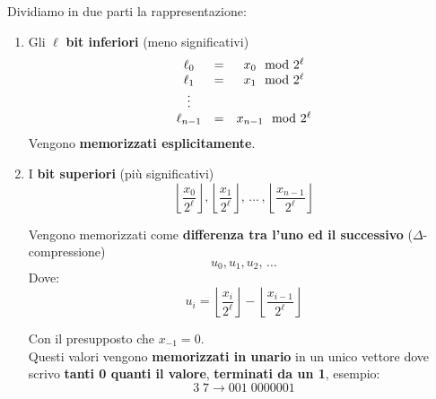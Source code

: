 Dividiamo in due parti la rappresentazione:
\begin{enumerate}
	\item Gli $\ell$ \textbf{bit inferiori} (meno significativi)
	$$ 
	\begin{array}{c c c}
		\ell_0 & = & x_0 \mod 2^\ell \\
		\ell_1 & = & x_1 \mod 2^\ell \\
		\vdots && \\
		\ell_{n-1} & = & x_{n-1} \mod 2^\ell \\
	\end{array}
	$$
	Vengono \textbf{memorizzati esplicitamente}.\\
	
	\item I \textbf{bit superiori} (più significativi)
	$$ \left\lfloor \frac{x_0}{2^\ell} \right\rfloor, \left\lfloor \frac{x_1}{2^\ell} \right\rfloor, \, \dots \, , \left\lfloor \frac{x_{n-1}}{2^\ell} \right\rfloor $$
	
	Vengono memorizzati come \textbf{differenza tra l'uno ed il successivo} ($\Delta$-compressione)
	$$ u_0, u_1, u_2, \, \dots $$
	Dove: 
	$$ u_i = \left\lfloor \frac{x_i}{2^\ell} \right\rfloor - \left\lfloor \frac{x_{i-1}}{2^\ell} \right\rfloor$$
	
	Con il presupposto che $x_{-1} =0$.\\
	Questi valori vengono \textbf{memorizzati in unario} in un unico vettore dove scrivo \textbf{tanti 0 quanti il valore}, \textbf{terminati da un 1}, esempio:
	$$ 3\; 7 \rightarrow 001 \; 0000001 $$
\end{enumerate}

